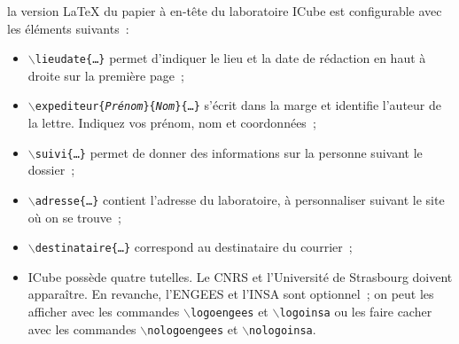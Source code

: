 \documentclass[a4paper,11pt,twosided]{letter}
\begin{document}
la version \LaTeX{} du papier à en-tête du laboratoire ICube est configurable avec les éléments suivants~:
\begin{itemize}
  
  \item \texttt{$\backslash{}$lieudate\{\dots\}} permet d'indiquer
  le lieu et la date de rédaction en haut à droite sur la première page~;

  \item \texttt{$\backslash{}$expediteur\{\textit{Prénom}\}\{\textit{Nom}\}\{\dots\}}
  s'écrit dans la marge et identifie l'auteur de la lettre. Indiquez vos prénom, nom et coordonnées~;

  \item \texttt{$\backslash{}$suivi\{\dots\}} permet de donner des informations sur la personne suivant le dossier~;

  \item \texttt{$\backslash{}$adresse\{\dots\}} contient l'adresse du laboratoire,
  à personnaliser suivant le site où on se trouve~;

  \item \texttt{$\backslash{}$destinataire\{\dots\}} correspond au destinataire du courrier~;

  \item ICube possède quatre tutelles. Le CNRS et l'Université de Strasbourg doivent apparaître.
  En revanche, l'ENGEES et l'INSA sont optionnel~;
  on peut les afficher avec les commandes \texttt{$\backslash$logoengees} et \texttt{$\backslash$logoinsa}
  ou les faire cacher avec les commandes \texttt{$\backslash$nologoengees} et \texttt{$\backslash$nologoinsa}.

\end{itemize}

\bigskip
\end{document}
